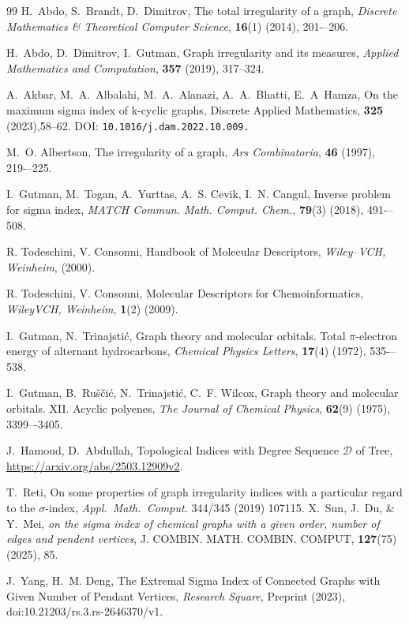 \documentclass[12pt, a4paper]{article}
\theoremstyle{plain}  %
\theoremstyle{definition}  %
\begin{document}
\begin{thebibliography}{99}
H.~Abdo, S.~Brandt, D.~Dimitrov,
 The total irregularity of a graph,
 \emph{Discrete Mathematics \& Theoretical Computer Science}, \textbf{16}(1) (2014), 201-–206.

H.~Abdo, D.~Dimitrov, I.~Gutman,
 Graph irregularity and its measures,
 \emph{Applied Mathematics and Computation}, \textbf{357} (2019), 317–324.

 A.~Akbar, M.~A.~Albalahi, M.~A.~Alanazi, A.~A.~Bhatti, E.~A~Hamza,
On the maximum sigma index of k-cyclic graphs,
Discrete Applied Mathematics, \textbf{325} (2023),58--62.
DOI: {\tt 10.1016/j.dam.2022.10.009.}

M.~O. Albertson,
 The irregularity of a graph,
 \emph{Ars Combinatoria}, \textbf{46} (1997), 219-–225.

I.~Gutman, M.~Togan, A.~Yurttas, A.~S. Cevik, I.~N. Cangul,
Inverse problem for sigma index,
 \emph{MATCH Commun. Math. Comput. Chem.}, \textbf{79}(3) (2018), 491-–508.

 R. Todeschini, V. Consonni, 
Handbook of Molecular Descriptors, 
{\em Wiley–VCH, Weinheim}, (2000). 

 R. Todeschini, V. Consonni, 
Molecular Descriptors for Chemoinformatics, 
{\em WileyVCH, Weinheim}, \textbf{1}(2) (2009).


I.~Gutman, N.~Trinajstić,
 Graph theory and molecular orbitals. Total $\pi$-electron energy of alternant hydrocarbons,
 \emph{Chemical Physics Letters}, \textbf{17}(4) (1972), 535-–538.

I.~Gutman, B.~Ruščić, N.~Trinajstić, C.~F. Wilcox,
 Graph theory and molecular orbitals. XII. Acyclic polyenes,
 \emph{The Journal of Chemical Physics}, \textbf{62}(9) (1975), 3399–-3405.


 J.~Hamoud, D.~Abdullah, Topological Indices with Degree Sequence $\mathscr{D}$ of Tree, \url{https://arxiv.org/abs/2503.12909v2}.

 T.~Reti, 
On some properties of graph irregularity indices with a particular regard to the $\sigma$-index, 
{\em Appl.~Math.~Comput.} 344/345 (2019) 107115.
 X.~Sun, J.~Du, \& Y.~Mei, \emph{on the sigma index of chemical graphs with a given order, number of edges and pendent vertices}, J. COMBIN. MATH. COMBIN. COMPUT, \textbf{127}(75) (2025), 85.

J.~Yang, H.~M. Deng,
 The Extremal Sigma Index of Connected Graphs with Given Number of Pendant Vertices,
 \emph{Research Square}, Preprint (2023), doi:10.21203/rs.3.rs-2646370/v1.
\end{thebibliography}
 
\end{document}
